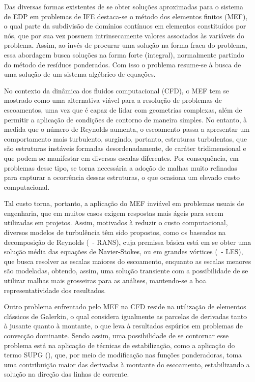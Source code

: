 Das diversas formas existentes de se obter soluções aproximadas para o sistema de EDP em problemas de IFE destaca-se o método dos elementos finitos (MEF), o qual parte da subdivisão de domínios contínuos em elementos constituídos por nós, que por sua vez possuem intrinsecamente valores associados às variáveis do problema. Assim, ao invés de procurar uma solução na forma fraca do problema, essa abordagem busca soluções na forma forte (integral), normalmente partindo do método de resíduos ponderados. Com isso o problema resume-se à busca de uma solução de um sistema algébrico de equações.

No contexto da dinâmica dos fluidos computacional (CFD), o MEF tem se mostrado como uma alternativa viável para a resolução de problemas de escoamentos, uma vez que é capaz de lidar com geometrias complexas, além de permitir a aplicação de condições de contorno de maneira simples. No entanto, à medida que o número de Reynolds aumenta, o escoamento passa a apresentar um comportamento mais turbulento, surgindo, portanto, estruturas turbulentas, que são estruturas instáveis formadas desordenadamente, de caráter tridimensional e que podem se manifestar em diversas escalas diferentes. Por consequência, em problemas desse tipo, se torna necessária a adoção de malhas muito refinadas para capturar a ocorrência dessas estruturas, o que ocasiona um elevado custo computacional.

Tal custo torna, portanto, a aplicação do MEF inviável em problemas usuais de engenharia, que em muitos casos exigem respostas mais ágeis para serem utilizadas em projetos. Assim, motivados à reduzir o custo computacional, diversos modelos de turbulência têm sido propostos, como os baseados na decomposição de Reynolds (\RANS\ - RANS), cuja premissa básica está em se obter uma solução média das equações de Navier-Stokes, ou em grandes vórtices (\LES\ - LES), que busca resolver as escalas maiores do escoamento, enquanto as escalas menores são modeladas, obtendo, assim, uma solução transiente com a possibilidade de se utilizar malhas mais grosseiras para as análises, mantendo-se a boa representatividade dos resultados.

Outro problema enfrentado pelo MEF na CFD reside na utilização de elementos clássicos de Galerkin, o qual considera igualmente as parcelas de derivadas tanto à jusante quanto à montante, o que leva à resultados espúrios em problemas de convecção dominante. Sendo assim, uma possibilidade de se contornar esse problema está na aplicação de técnicas de estabilização, como a aplicação do termo SUPG (\SUPG), que, por meio de modificação nas funções ponderadoras, toma uma contribuição maior das derivadas à montante do escoamento, estabilizando a solução na direção das linhas de corrente.


